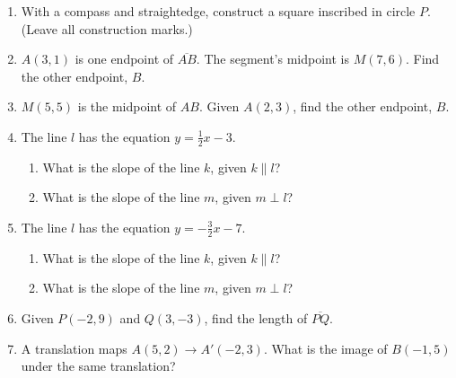 \begin{enumerate}
\item With a compass and straightedge, construct a square inscribed in circle $P$. (Leave all construction marks.)
\vspace{1cm}
\begin{center}
\end{center}

\newpage
\item $A(3,1)$ is one endpoint of $\overline{AB}$. The segment's midpoint is $M(7,6)$. Find the other endpoint, $B$. \vspace{5cm}

\item $M(5,5)$ is the midpoint of $AB$. Given $A(2,3)$, find the other endpoint, $B$. \vspace{2cm}

\item The line $l$ has the equation $y=\frac{1}{2} x-3$.
  \begin{enumerate}
    \item What is the slope of the line $k$, given $k \parallel l$?
    \vspace{1cm}
    \item What is the slope of the line $m$, given $m \perp l$?
    \vspace{1cm}
  \end{enumerate}

\item The line $l$ has the equation $y=-\frac{3}{2} x-7$.
  \begin{enumerate}
    \item What is the slope of the line $k$, given $k \parallel l$?
    \vspace{1.5cm}
    \item What is the slope of the line $m$, given $m \perp l$?
    \vspace{2.5cm}
  \end{enumerate}

\item Given $P(-2,9)$ and $Q(3,-3)$, find the length of $\overline{PQ}$.
  \vspace{4cm}

\item A translation maps $A(5,2) \rightarrow A'(-2,3)$. What is the image of $B(-1,5)$ under the same translation?  \vspace{0.5cm}


\end{enumerate}
